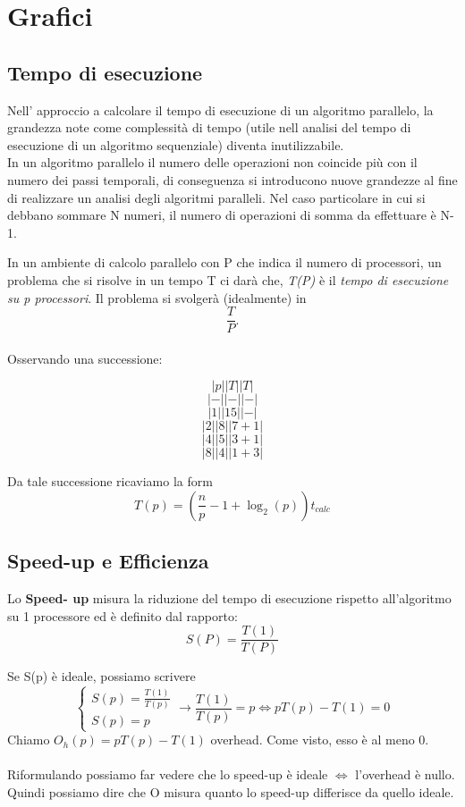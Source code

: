 \documentclass{article}
\begin{document}
\section{Grafici}
\subsection{Tempo di esecuzione}

Nell' approccio a calcolare il tempo di esecuzione di un algoritmo parallelo, la grandezza note come complessità di tempo (utile nell analisi del tempo di esecuzione di un algoritmo sequenziale) diventa inutilizzabile.\\
In un algoritmo parallelo il numero delle operazioni non coincide più con il numero dei passi temporali, di conseguenza si introducono nuove grandezze al fine di realizzare un analisi degli algoritmi paralleli. Nel caso particolare in cui si debbano sommare N numeri, il numero di operazioni di somma da effettuare è N-1.

In un ambiente di calcolo parallelo con P che indica il numero di processori, un problema che si risolve in un tempo T ci darà che, \textit{T(P)} è il \textit{tempo di esecuzione su p processori}. Il problema si svolgerà (idealmente) in $$ \frac{T}{P}. $$ \\

Osservando una successione:

$$|p| |T| |T|$$
$$|-| |-| |-|$$
$$|1| |15| |-|$$
$$|2| |8| |7+1|$$
$$|4| |5| |3+1|$$
$$|8| |4| |1+3|$$

Da tale successione ricaviamo la form
$$T(p)=(\frac{n}{p}-1 + \log_2(p))t_{calc} $$


\subsection{Speed-up e Efficienza}

Lo \textbf{Speed- up} misura la riduzione del tempo di esecuzione rispetto all'algoritmo su 1 processore ed è definito dal rapporto:
$$ S(P) = \frac{T(1)}{T(P)} $$ 

Se S(p) è ideale, possiamo scrivere
$$ 
\begin{cases} 
S(p) = \frac{T(1)}{T(p)}\\
S(p) = p
\end{cases}
\rightarrow
\frac{T(1)}{T(p)} = p \iff pT(p) -T(1) = 0
$$
Chiamo  $O_h(p) = pT(p) - T(1)$ overhead. Come visto, esso è al meno 0.\\
\\
Riformulando possiamo far vedere che lo speed-up è ideale $\iff$ l'overhead è nullo.\\
Quindi possiamo dire che O  misura quanto lo speed-up differisce da quello ideale.
\end{document}
